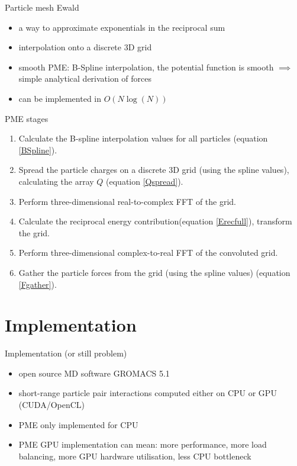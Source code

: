 \documentclass[11pt]{beamer}
\begin{document}
\begin{frame}{Particle mesh Ewald}
\begin{itemize}
\item a way to approximate exponentials in the reciprocal sum 
\item interpolation onto a discrete 3D grid
\item smooth PME: B-Spline interpolation, the potential function is smooth $\implies$ simple analytical derivation of forces
\item can be implemented in $O(N \log(N))$
\end{itemize}
\end{frame}

\begin{frame}{PME stages}
\begin{enumerate}
\item Calculate the B-spline interpolation values for all particles (equation \eqref{BSpline}).
\item Spread the particle charges on a discrete 3D grid (using the spline values), calculating the array $Q$ (equation \eqref{Qspread}).
\item Perform three-dimensional real-to-complex FFT of the grid.
\item Calculate the reciprocal energy contribution(equation \eqref{Erecfull}), transform the grid.
\item Perform three-dimensional complex-to-real FFT of the convoluted grid.
\item Gather the particle forces from the grid (using the spline values) (equation \eqref{Fgather}).
\end{enumerate}
\end{frame}


\section{Implementation}
\begin{frame}{Implementation (or still problem)}
\begin{itemize}
\item open source MD software GROMACS 5.1
\item short-range particle pair interactions computed either on CPU or GPU (CUDA/OpenCL)
\item PME only implemented for CPU
\item PME GPU implementation can mean: more performance, more load balancing, more GPU hardware utilisation, less CPU bottleneck 
\end{itemize}
\end{frame}
\end{document}
